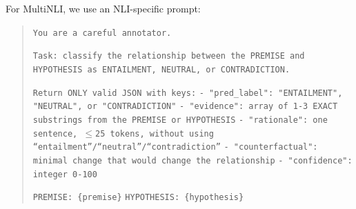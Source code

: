 \documentclass[letterpaper]{article}
\begin{document}
\noindent For MultiNLI, we use an NLI-specific prompt:

\begin{quote}
\small
\texttt{You are a careful annotator.}

\texttt{Task: classify the relationship between the PREMISE and HYPOTHESIS as ENTAILMENT, NEUTRAL, or CONTRADICTION.}

\texttt{Return ONLY valid JSON with keys:}
\texttt{- "pred\_label": "ENTAILMENT", "NEUTRAL", or "CONTRADICTION"}
\texttt{- "evidence": array of 1-3 EXACT substrings from the PREMISE or HYPOTHESIS}
\texttt{- "rationale": one sentence, $\leq$25 tokens, without using ``entailment''/``neutral''/``contradiction''}
\texttt{- "counterfactual": minimal change that would change the relationship}
\texttt{- "confidence": integer 0-100}

\texttt{PREMISE: \{premise\}}
\texttt{HYPOTHESIS: \{hypothesis\}}
\end{quote}



% 
\end{document}
